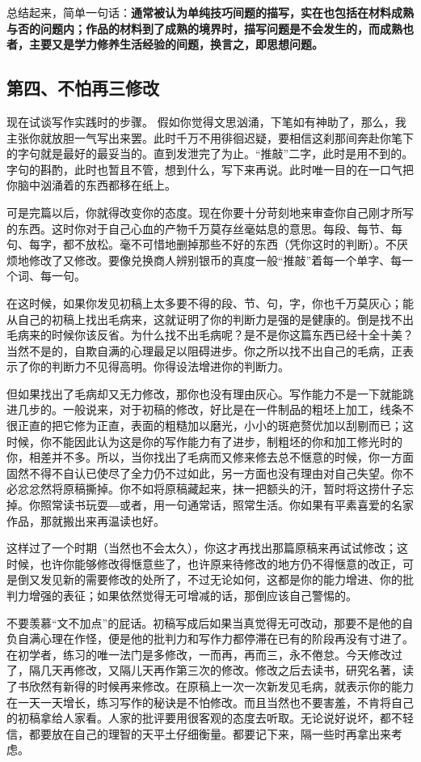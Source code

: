 \documentclass[12pt,a5paper]{ctexbook}
\begin{document}
总结起来，简单一句话：\textbf{通常被认为单纯技巧间题的描写，实在也包括在材料成熟与否的问题内；作品的材料到了成熟的境界时，描写问题是不会发生的，而成熟也者，主要又是学力修养生活经验的间题，换言之，即思想问题。}

\subsection{第四、不怕再三修改}
现在试谈写作实践时的步骤。
假如你觉得文思汹涌，下笔如有神助了，那么，我主张你就放胆一气写出来罢。此时千万不用徘徊迟疑，要相信这刹那间奔赴你笔下的字句就是最好的最妥当的。直到发泄完了为止。“推敲”二字，此时是用不到的。字句的斟酌，此时也暂且不管，想到什么，写下来再说。此时唯一目的在一口气把你脑中汹涌着的东西都移在纸上。

可是完篇以后，你就得改变你的态度。现在你要十分苛刻地来审查你自己刚才所写的东西。这时你对于自己心血的产物千万莫存丝毫姑息的意思。每段、每节、每句、每字，都不放松。毫不可惜地删掉那些不好的东西（凭你这时的判断）。不厌烦地修改了又修改。要像兑换商人辨别银币的真度一般“推敲”着每一个单字、每一个词、每一句。

在这时候，如果你发见初稿上太多要不得的段、节、句，字，你也千万莫灰心；能从自己的初稿上找出毛病来，这就证明了你的判断力是强的是健康的。倒是找不出毛病来的时候你该反省。为什么找不出毛病呢？是不是你这篇东西已经十全十美？当然不是的，自欺自满的心理最足以阻碍进步。你之所以找不出自己的毛病，正表示了你的判断力不见得高明。你得设法增进你的判断力。

但如果找出了毛病却又无力修改，那你也没有理由灰心。写作能力不是一下就能跳进几步的。一般说来，对于初稿的修改，好比是在一件制品的粗坯上加工，线条不很正直的把它修为正直，表面的粗糙加以磨光，小小的斑疤赘优加以刮剔而已；这时候，你不能因此认为这是你的写作能力有了进步，制粗坯的你和加工修光时的你，相差并不多。所以，当你找出了毛病而又修来修去总不惬意的时候，你一方面固然不得不自认已使尽了全力仍不过如此，另一方面也没有理由对自己失望。你不必忿忿然将原稿撕掉。你不如将原稿藏起来，抹一把额头的汗，暂时将这捞什子忘掉。你照常读书玩耍―或者，用一句通常话，照常生活。你如果有平素喜爱的名家作品，那就搬出来再温读也好。

这样过了一个时期（当然也不会太久），你这才再找出那篇原稿来再试试修改；这时候，也许你能够修改得惬意些了，也许原来待修改的地方仍不得惬意的改正，可是倒又发见新的需要修改的处所了，不过无论如何，这都是你的能力增进、你的批判力增强的表征；如果依然觉得无可增减的话，那倒应该自己警惕的。

不要羡慕“文不加点”的屁话。初稿写成后如果当真觉得无可改动，那要不是他的自负自满心理在作怪，便是他的批判力和写作力都停滞在已有的阶段再没有寸进了。在初学者，练习的唯一法门是多修改，一而再，再而三，永不倦怠。今天修改过了，隔几天再修改，又隔儿天再作第三次的修改。修改之后去读书，研究名著，读了书欣然有新得的时候再来修改。在原稿上一次一次新发见毛病，就表示你的能力在一天一天增长，练习写作的秘诀是不怕修改。而且当然也不要害羞，不肯将自己的初稿拿给人家看。人家的批评要用很客观的态度去听取。无论说好说坏，都不轻信，都要放在自己的理智的天平土仔细衡量。都要记下来，隔一些时再拿出来考虑。
\end{document}
